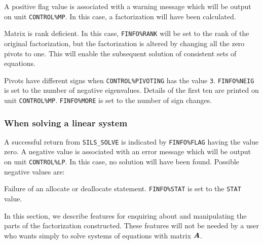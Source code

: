 \documentclass{galahad}
\newcommand{\packagename}{SILS}
\begin{document}
A positive flag value is associated with a warning message 
 which will  be output on unit {\tt CONTROL\%MP}. In this case, a 
 factorization will have been calculated. 
 
\begin{description} 
 Matrix is rank deficient.  In this case, {\tt FINFO\%RANK} will be 
set to the rank of the original factorization, but the factorization is 
altered by changing all the zero pivots to one. This will enable the 
subsequent solution of consistent sets of equations. 
 
 Pivots have different signs when {\tt CONTROL\%PIVOTING} has the value 
 {\tt 3}. 
 {\tt FINFO\%NEIG} is set to the number of negative eigenvalues. 
 Details of the first ten are printed on unit {\tt CONTROL\%MP}. 
       {\tt FINFO\%MORE} is set to the number of sign changes. 
 
\end{description} 
 

\subsubsection{When solving a linear system}\label{errorsolve}
A successful return from {\tt \packagename\_SOLVE} is indicated by 
 {\tt FINFO\%FLAG} having the value zero.  A negative value is 
 associated with an error message which will  be output on unit 
 {\tt CONTROL\%LP}. In this case, no solution will have been 
 found.  Possible negative values are: 
 
 
\begin{description} 
 Failure of an allocate or deallocate statement. {\tt FINFO\%STAT} 
 is set to the {\tt STAT} value.  
\end{description} 
 

\galfeatures
\noindent In this section, we describe features for enquiring about and 
manipulating the parts of the factorization constructed. These features 
will not be needed by a user who wants simply to solve systems of 
equations with matrix ${\bm{A}}$. 
\end{document}

